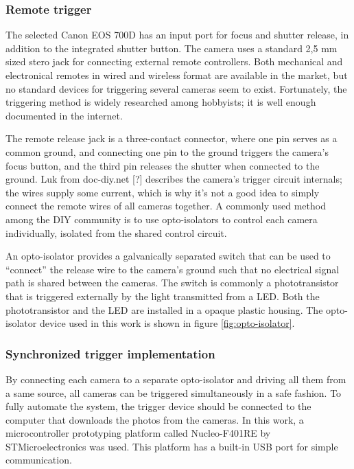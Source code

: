 \subsubsection{Remote trigger} %

The selected Canon EOS 700D has an input port for focus and shutter release, in addition to the integrated shutter button.
The camera uses a standard 2,5 mm sized stero jack for connecting external remote controllers.
Both mechanical and electronical remotes in wired and wireless format are available in the market, but no standard devices for triggering several cameras seem to exist.
Fortunately, the triggering method is widely researched among hobbyists; it is well enough documented in the internet.

The remote release jack is a three-contact connector, where one pin serves as a common ground, and connecting one pin to the ground triggers the camera's focus button, and the third pin releases the shutter when connected to the ground.
Luk from doc-diy.net [?] describes the camera's trigger circuit internals; the wires supply some current, which is why it's not a good idea to simply connect the remote wires of all cameras together.
A commonly used method among the DIY community is to use opto-isolators to control each camera individually, isolated from the shared control circuit.

An opto-isolator provides a galvanically separated switch that can be used to ``connect'' the release wire to the camera's ground such that no electrical signal path is shared between the cameras.
The switch is commonly a phototransistor that is triggered externally by the light transmitted from a LED.
Both the phototransistor and the LED are installed in a opaque plastic housing.
The opto-isolator device used in this work is shown in figure \ref{fig:opto-isolator}.



\subsubsection{Synchronized trigger implementation} %

By connecting each camera to a separate opto-isolator and driving all them from a same source, all cameras can be triggered simultaneously in a safe fashion.
To fully automate the system, the trigger device should be connected to the computer that downloads the photos from the cameras.
In this work, a microcontroller prototyping platform called Nucleo-F401RE by STMicroelectronics was used.
This platform has a built-in USB port for simple communication.

